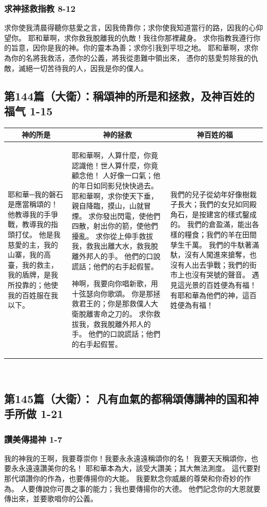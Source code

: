 \subsubsection{求神拯救指教 8-12}
求你使我清晨得聽你慈愛之言，因我倚靠你；求你使我知道當行的路，因我的心仰望你。
耶和華啊，求你救我脫離我的仇敵！我往你那裡藏身。
求你指教我遵行你的旨意，因你是我的神。你的靈本為善；求你引我到平坦之地。
耶和華啊，求你為你的名將我救活，憑你的公義，將我從患難中領出來，
憑你的慈愛剪除我的仇敵，滅絕一切苦待我的人，因我是你的僕人。


\subsection{第144篇（大衛）：稱頌神的所是和拯救，及神百姓的福气 1-15}
\begin{table}[H]
\centering
\begin{tabular}{p{3.25cm}|p{8.5cm}|p{5.00cm}}\hline\hline
\multicolumn{1}{c|}{神的所是}&\multicolumn{1}{c|}{神的拯救}&\multicolumn{1}{c}{神百姓的福}\\\hline
耶和華─我的磐石是應當稱頌的！他教導我的手爭戰，教導我的指頭打仗。
他是我慈愛的主，我的山寨，我的高臺，我的救主，我的盾牌，是我所投靠的；他使我的百姓服在我以下。
&耶和華啊，人算什麼，你竟認識他！世人算什麼，你竟顧念他！
人好像一口氣；他的年日如同影兒快快過去。
耶和華啊，求你使天下垂，親自降臨，摸山，山就冒煙。
求你發出閃電，使他們四散，射出你的箭，使他們擾亂。
求你從上伸手救拔我，救我出離大水，救我脫離外邦人的手。
他們的口說謊話；他們的右手起假誓。

神啊，我要向你唱新歌，用十弦瑟向你歌頌。
你是那拯救君王的；你是那救僕人大衛脫離害命之刀的。
求你救拔我，救我脫離外邦人的手。
他們的口說謊話；他們的右手起假誓。
&我們的兒子從幼年好像樹栽子長大；我們的女兒如同殿角石，是按建宮的樣式鑿成的。
我們的倉盈滿，能出各樣的糧食；我們的羊在田間孳生千萬。
我們的牛馱著滿馱，沒有人闖進來搶奪，也沒有人出去爭戰；我們的街市上也沒有哭號的聲音。
遇見這光景的百姓便為有福！有耶和華為他們的神，這百姓便為有福！\\\hline
\end{tabular}
\end{table} 








\subsection{第145篇（大衛）： 凡有血氣的都稱頌傳講神的国和神手所做 1-21}
\subsubsection{讚美傳揚神 1-7}
我的神我的王啊，我要尊崇你！我要永永遠遠稱頌你的名！
我要天天稱頌你，也要永永遠遠讚美你的名！
耶和華本為大，該受大讚美；其大無法測度。
這代要對那代頌讚你的作為，也要傳揚你的大能。
我要默念你威嚴的尊榮和你奇妙的作為。
人要傳說你可畏之事的能力；我也要傳揚你的大德。
他們記念你的大恩就要傳出來，並要歌唱你的公義。

